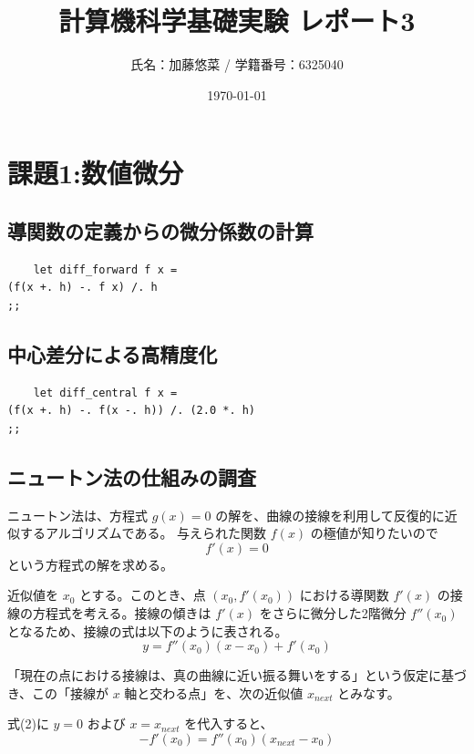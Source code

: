\documentclass[titlepage]{ltjsarticle}
\title{計算機科学基礎実験 レポート3}
\author{氏名：加藤悠菜 / 学籍番号：6325040}
\date{\today}
\begin{document}
\maketitle

\section{課題1:数値微分}

\subsection{導関数の定義からの微分係数の計算}
\begin{verbatim}
    let diff_forward f x =
(f(x +. h) -. f x) /. h
;;
\end{verbatim}

\subsection{中心差分による高精度化}
\begin{verbatim}
    let diff_central f x =
(f(x +. h) -. f(x -. h)) /. (2.0 *. h)
;;
\end{verbatim}

\subsection{ニュートン法の仕組みの調査}
ニュートン法は、方程式 $g(x) = 0$ の解を、曲線の接線を利用して反復的に近似するアルゴリズムである。
与えられた関数 $f(x)$ の極値が知りたいので
\begin{equation}
f'(x) = 0
\end{equation}
という方程式の解を求める。
\par
近似値を $x_0$ とする。このとき、点 $(x_0, f'(x_0))$ における導関数 $f'(x)$ の接線の方程式を考える。接線の傾きは $f'(x)$ をさらに微分した2階微分 $f''(x_0)$ となるため、接線の式は以下のように表される。
\begin{equation}
y = f''(x_0)(x - x_0) + f'(x_0)
\end{equation}

「現在の点における接線は、真の曲線に近い振る舞いをする」という仮定に基づき、この「接線が $x$ 軸と交わる点」を、次の近似値 $x_{next}$ とみなす。

式(2)に $y = 0$ および $x = x_{next}$ を代入すると、
\begin{equation}
-f'(x_0) = f''(x_0)(x_{next} - x_0)
\end{equation}
\end{document}
